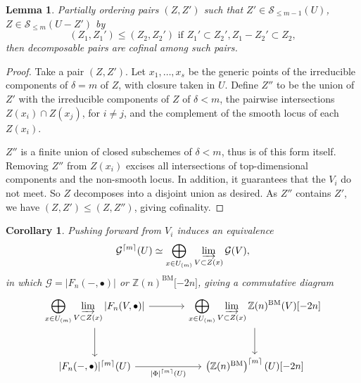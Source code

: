 \documentclass[11pt, twoside]{article}
\numberwithin{equation}{section}
\newtheorem{lemma}[equation]{Lemma}
\newtheorem{corollary}[equation]{Corollary}
\theoremstyle{definition}
\newcommand{\bb}[1]{\mathbb{#1}}
\newcommand{\colim}{\varinjlim}
\newcommand{\bm}{\mathrm{BM}}
\begin{document}
\begin{lemma}
Partially ordering pairs \((Z, Z')\) such that \(Z' \in \mathcal{S}_{\leq m - 1}(U)\), \(Z \in \mathcal{S}_{\leq m}(U - Z')\) by 
\[(Z_1, Z_1') \leq (Z_2, Z_2') \text{ if } Z_1' \subset Z_2', Z_1 - Z_2' \subset Z_2,\]
then decomposable pairs are cofinal among such pairs.
\end{lemma}

\begin{proof}
Take a pair \((Z, Z')\). Let \(x_1, \dots , x_s\) be the generic points of the irreducible components of \(\delta = m\) of \(Z\), with closure taken in \(U\). Define \(Z''\) to be the union of \(Z'\) with the irreducible components of \(Z\) of \(\delta < m\), the pairwise intersections \(Z(x_i) \cap Z(x_j)\), for \(i \neq j\), and the complement of the smooth locus of each \(Z(x_i)\).

\(Z''\) is a finite union of closed subschemes of \(\delta < m\), thus is of this form itself. Removing \(Z''\) from \(Z(x_i)\) excises all intersections of top-dimensional components and the non-smooth locus. In addition, it guarantees that the \(V_i\) do not meet. So \(Z\) decomposes into a disjoint union as desired. As \(Z''\) contains \(Z'\), we have \((Z, Z') \leq (Z, Z'')\), giving cofinality.
\end{proof}

\begin{corollary}\label{corr:shell-decomp}
Pushing forward from \(V_i\) induces an equivalence 
\[\mathcal{G}^{\lceil m \rceil}(U) \simeq \bigoplus_{x \in U_{(m)}} \colim_{V \subset Z(x)} \mathcal{G}(V),\]
in which \(\mathcal{G} = |F_n( -, \bullet)|\) or \(\bb{Z}(n)^\bm \lbrack -2n \rbrack\), giving a commutative diagram
\begin{equation}\label{eq:shell-decomp}
\begin{tikzcd} [row sep = large, column sep = large]
\displaystyle \bigoplus_{x \in U_{(m)}} \colim_{V \subset Z(x)} |F_n(V, \bullet)| \ar[d] \ar[r] & \displaystyle \bigoplus_{x \in U_{(m)}} \colim_{V \subset Z(x)} \bb{Z}(n)^\bm(V) \lbrack -2n \rbrack \ar[d]\\
\lvert F_n( -, \bullet)\rvert^{\lceil m \rceil}(U) \ar[r, "|\Phi|^{\lceil m \rceil}(U)", swap] & \left(\bb{Z}(n)^\bm\right)^{\lceil m \rceil}(U)\lbrack -2n \rbrack
\end{tikzcd}
\end{equation}
\end{corollary}
\end{document}
